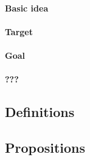\paragraph{Basic idea}

\ideaUSE*

\paragraph*{Target}

\targetESU*

\paragraph*{Goal}

\goalEAS*

\thoughtEASw*


\hozline

\paragraph{???}

\ideaCSbyAR*

\ideaCSbyWR*

\subsection*{Definitions}









\subsection*{Propositions}

\propRecogniseDefeaters*


\propScenariosExist*

\propAbilityExuastive*

\propNoESUandADB*

\propLCS*

\propFCS*

